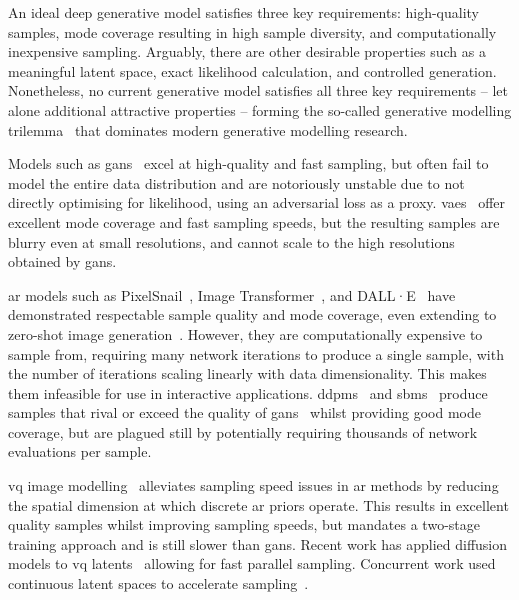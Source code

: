An ideal deep generative model satisfies three key requirements: high-quality
samples, mode coverage resulting in high sample diversity, and computationally
inexpensive sampling. Arguably, there are other desirable properties such as a
meaningful latent space, exact likelihood calculation, and controlled
generation. Nonetheless, no current generative model satisfies all three key
requirements -- let alone additional attractive properties -- forming the
so-called generative modelling trilemma~\cite{xiao2021trilemma} that dominates
modern generative modelling research.

Models such as \glspl{gan}~\cite{goodfellow2014gan} excel at high-quality and
fast sampling, but often fail to model the entire data distribution and are
notoriously unstable due to not directly optimising for likelihood, using an
adversarial loss as a proxy. \Glspl{vae}~\cite{kingma2013vae} offer excellent
mode coverage and fast sampling speeds, but the resulting samples are blurry
even at small resolutions, and cannot scale to the high resolutions obtained by
\glspl{gan}.

\Gls{ar} models such as PixelSnail~\cite{chen2017snail}, Image
Transformer~\cite{parmar2018image}, and DALL·E~\cite{parmar2018image} have
demonstrated respectable sample quality and mode coverage, even extending to
zero-shot image generation~\cite{ramesh2021dalle}. However, they are
computationally expensive to sample from, requiring many network iterations to
produce a single sample, with the number of iterations scaling linearly with
data dimensionality. This makes them infeasible for use in interactive
applications. \Glspl{ddpm}~\cite{ho2020ddpm} and
\glspl{sbm}~\cite{song2019sbm,song2020sde,song2021mlt} produce samples that
rival or exceed the quality of \glspl{gan}~\cite{dhariwal2021ddpm} whilst
providing good mode coverage, but are plagued still by potentially requiring
thousands of network evaluations per sample.

\Gls{vq} image
modelling~\cite{oord2017vqvae,razavi2019generating,esser2021taming} alleviates
sampling speed issues in \gls{ar} methods by reducing the spatial dimension at
which discrete \gls{ar} priors operate. This results in excellent quality
samples whilst improving sampling speeds, but mandates a two-stage training
approach and is still slower than \glspl{gan}. Recent work has
applied diffusion models to \gls{vq} latents~\cite{bondtaylor2021unleashing}
allowing for fast parallel sampling. Concurrent work used continuous latent
spaces to accelerate sampling~\cite{xiao2021trilemma,vahdat2021sbmlatent}.

